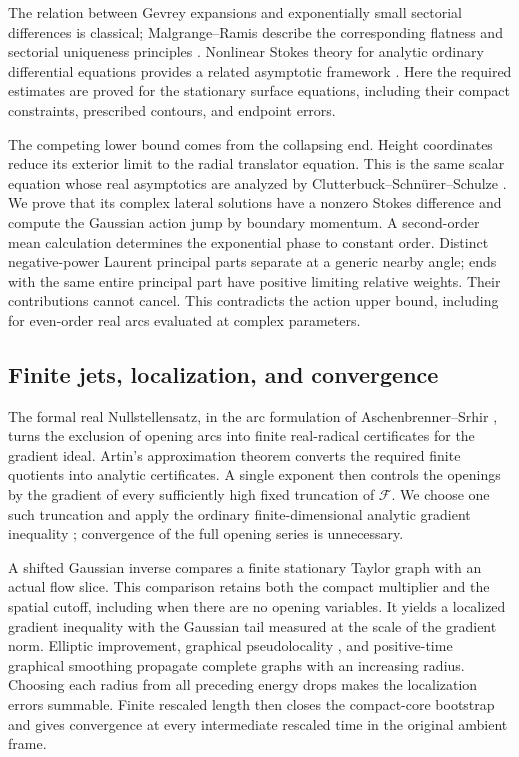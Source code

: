 The relation between Gevrey expansions and exponentially small
sectorial differences is classical; Malgrange--Ramis describe the
corresponding flatness and sectorial uniqueness principles
\cite[Sections~1.3--1.6]{MR1992}. Nonlinear Stokes theory for analytic
ordinary differential equations provides a related asymptotic framework
\cite{Costin1998}. Here the required estimates are proved for the
stationary surface equations, including their compact constraints,
prescribed contours, and endpoint errors.

The competing lower bound comes from the collapsing end. Height
coordinates reduce its exterior limit to the radial translator
equation. This is the same scalar equation whose real asymptotics
are analyzed by Clutterbuck--Schn\"urer--Schulze
\cite[Section~2]{CSS2007}. We prove that its complex lateral solutions
have a nonzero Stokes difference and compute the Gaussian action jump
by boundary momentum. A second-order mean calculation determines the
exponential phase to constant order. Distinct negative-power Laurent
principal parts separate at a generic nearby angle; ends with the same
entire principal part have positive limiting relative weights. Their
contributions cannot cancel. This contradicts the action upper bound,
including for even-order real arcs evaluated at complex parameters.

\subsection{Finite jets, localization, and convergence}

The formal real Nullstellensatz, in the arc formulation of
Aschenbrenner--Srhir \cite[Corollary~4.8]{AS2024}, turns the exclusion of opening arcs into
finite real-radical certificates for the gradient ideal. Artin's
approximation theorem \cite[Theorem~1.2]{Artin1968} converts the
required finite quotients into analytic certificates. A single exponent
then controls the openings by the gradient of every sufficiently
high fixed truncation of $\mathcal F$. We choose one such truncation
and apply the ordinary finite-dimensional analytic gradient inequality
\cite[Section~IV.9]{Lojasiewicz1993}; convergence of the full opening
series is unnecessary.

A shifted Gaussian inverse compares a finite stationary Taylor graph
with an actual flow slice. This comparison retains both the compact
multiplier and the spatial cutoff, including when there are no opening
variables. It yields a localized gradient inequality with the Gaussian
tail measured at the scale of the gradient norm. Elliptic improvement,
graphical pseudolocality \cite[Theorem~1.5]{INS2019}, and positive-time
graphical smoothing \cite{EckerHuisken1991} propagate complete graphs
with an increasing radius. Choosing each radius from all preceding
energy drops makes the localization errors summable. Finite rescaled
length then closes the compact-core bootstrap and gives convergence
at every intermediate rescaled time in the original ambient frame.

